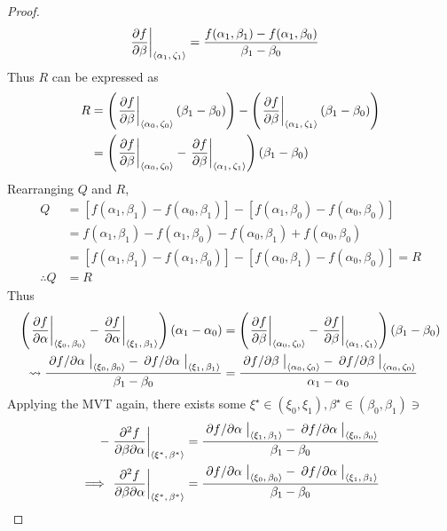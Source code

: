 \begin{lemma}
\begin{proof}
\begin{align*}
			\eval{\pdv{f}{\beta}}_{\point{\alpha_1}{\zeta_1}}&=\frac{f(\alpha_1,\beta_1)-f(\alpha_1,\beta_0)}{\beta_1-\beta_0}
		\end{align*}
		Thus $R$ can be expressed as
		\begin{align*}
			R&=\left(\eval{\pdv{f}{\beta}}_{\point{\alpha_0}{\zeta_0}}\left(\beta_1-\beta_0\right)\right)-\left(\eval{\pdv{f}{\beta}}_{\point{\alpha_1}{\zeta_1}}\left(\beta_1-\beta_0\right)\right)\\
			&=\left(\eval{\pdv{f}{\beta}}_{\point{\alpha_0}{\zeta_0}}-\eval{\pdv{f}{\beta}}_{\point{\alpha_1}{\zeta_1}}\right)\left(\beta_1-\beta_0\right)
		\end{align*}
		Rearranging $Q$ and $R$,
		\begin{align*}
			Q&=[f(\alpha_1,\beta_1)-f(\alpha_0,\beta_1)]-[f(\alpha_1,\beta_0)-f(\alpha_0,\beta_0)]\\
			&=f(\alpha_1,\beta_1)-f(\alpha_1,\beta_0)-f(\alpha_0,\beta_1)+f(\alpha_0,\beta_0)\\
			&=[f(\alpha_1,\beta_1)-f(\alpha_1,\beta_0)]-[f(\alpha_0,\beta_1)-f(\alpha_0,\beta_0)]=R\\
			\therefore Q&=R
		\end{align*}
		Thus
		\begin{align}
			\notag\left(\eval{\pdv{f}{\alpha}}_{\point{\xi_0}{\beta_0}}-\eval{\pdv{f}{\alpha}}_{\point{\xi_1}{\beta_1}}\right)\left(\alpha_1-\alpha_0\right)&=\left(\eval{\pdv{f}{\beta}}_{\point{\alpha_0}{\zeta_0}}-\eval{\pdv{f}{\beta}}_{\point{\alpha_1}{\zeta_1}}\right)\left(\beta_1-\beta_0\right)\\
			\label{proof:SYMMETRY}\leadsto\frac{\eval{\pdv*{f}{\alpha}}_{\point{\xi_0}{\beta_0}}-\eval{\pdv*{f}{\alpha}}_{\point{\xi_1}{\beta_1}}}{\beta_1-\beta_0}&=\frac{\eval{\pdv*{f}{\beta}}_{\point{\alpha_0}{\zeta_0}}-\eval{\pdv*{f}{\beta}}_{\point{\alpha_0}{\zeta_0}}}{\alpha_1-\alpha_0}
		\end{align}
		Applying the MVT again, there exists some $\xi^\star\in(\xi_0,\xi_1),\beta^\star\in(\beta_0,\beta_1)\ni$
		\begin{align*}
			-\eval{\pdv{f}{\beta}{\alpha}}_{\point{\xi^\star}{\beta^\star}}&=\frac{\eval{\pdv*{f}{\alpha}}_{\point{\xi_1}{\beta_1}}-\eval{\pdv*{f}{\alpha}}_{\point{\xi_0}{\beta_0}}}{\beta_1-\beta_0}\\
			\implies\eval{\pdv{f}{\beta}{\alpha}}_{\point{\xi^\star}{\beta^\star}}&=\frac{\eval{\pdv*{f}{\alpha}}_{\point{\xi_0}{\beta_0}}-\eval{\pdv*{f}{\alpha}}_{\point{\xi_1}{\beta_1}}}{\beta_1-\beta_0}
		\end{align*}

\end{proof}
\end{lemma}
